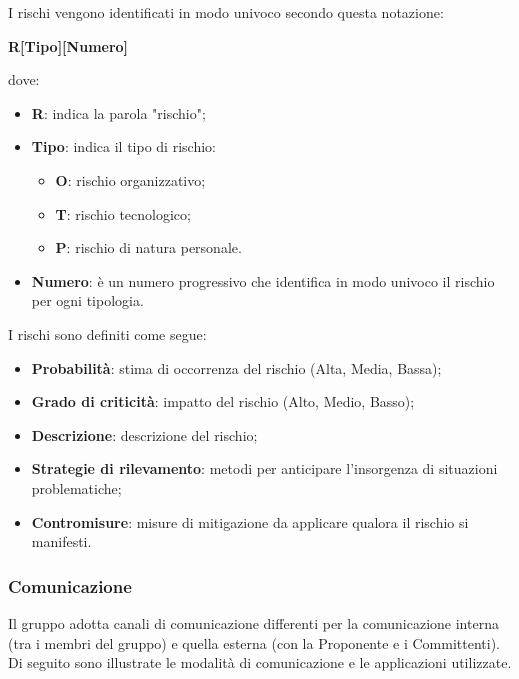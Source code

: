 \par I rischi vengono identificati in modo univoco secondo questa notazione: 
\par \quad \textbf{R[Tipo][Numero]}
\par dove: 
\begin{itemize}
  \item \textbf{R}: indica la parola "rischio";
  \item \textbf{Tipo}: indica il tipo di rischio: 
  \begin{itemize}
    \item \textbf{O}: rischio organizzativo; 
    \item \textbf{T}: rischio tecnologico;
    \item \textbf{P}: rischio di natura personale.
  \end{itemize}
  \item \textbf{Numero}: è un numero progressivo che identifica in modo univoco il rischio per ogni tipologia.
\end{itemize}

\par I rischi sono definiti come segue:
\begin{itemize}
  \item \textbf{Probabilità}: stima di occorrenza del rischio (Alta, Media, Bassa);
  \item \textbf{Grado di criticità}: impatto del rischio (Alto, Medio, Basso);
  \item \textbf{Descrizione}: descrizione del rischio;
  \item \textbf{Strategie di rilevamento}: metodi per anticipare l'insorgenza di situazioni problematiche;
  \item \textbf{Contromisure}: misure di mitigazione da applicare qualora il rischio si manifesti.
\end{itemize}

\subsubsection{Comunicazione}
\par Il gruppo adotta canali di comunicazione differenti per la comunicazione interna (tra i membri del gruppo) e quella esterna (con la Proponente e i Committenti). Di seguito sono illustrate le modalità di comunicazione e le applicazioni utilizzate.

